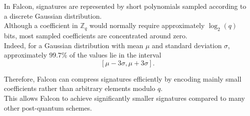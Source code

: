 \noindent
In Falcon, signatures are represented by short polynomials sampled according to a discrete Gaussian distribution.\\
Although a coefficient in $\mathbb{Z}_q$ would normally require approximately $\log_2(q)$ bits, most sampled coefficients are concentrated around zero.\\
Indeed, for a Gaussian distribution with mean $\mu$ and standard deviation $\sigma$, approximately $99.7\%$ of the values lie in the interval
\[
[\mu - 3\sigma,\mu + 3\sigma].
\]

\noindent
Therefore, Falcon can compress signatures efficiently by encoding mainly small coefficients rather than arbitrary elements modulo $q$.\\
This allows Falcon to achieve significantly smaller signatures compared to many other post-quantum schemes.
